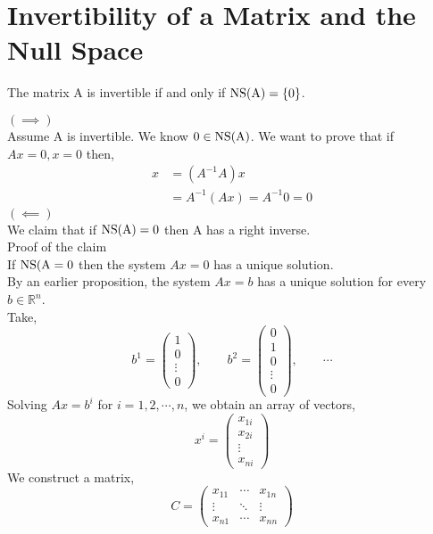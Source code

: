 \documentclass[12pt]{article}
\begin{document}
\section{Invertibility of a Matrix and the Null Space}
\begin{theo}{}
The matrix A is invertible if and only if \(\rm{NS}(A) = \{0\}\).
\end{theo}
\begin{prf}{}
\(\left(\implies\right)\)\\
Assume A is invertible. We know \(0 \in \rm{NS}(A)\). We want to prove that if \(Ax = 0, x = 0\) then,
\begin{align*}
x &= (A^{-1}A)x\\
&= A^{-1}(Ax) = A^{-1}0 = 0
\end{align*}
\(\left(\impliedby\right)\)\\
We claim that if \(\rm{NS}(A) = 0\) then A has a right inverse.\\
Proof of the claim\\
If \(\rm{NS}(A = 0\) then the system \(Ax = 0\) has a unique solution.\\
By an earlier proposition, the system \(Ax = b\) has a unique solution for every \(b \in \mathbb R^n\).\\
Take,
\[
b^1 = \begin{pmatrix}
    1 \\ 0 \\ \vdots\\ 0
\end{pmatrix},
\qquad b^2 = \begin{pmatrix}
    0 \\ 1 \\0\\ \vdots\\ 0
\end{pmatrix},
\qquad \cdots 
\]
Solving \(Ax = b^i\) for \(i = 1, 2, \cdots, n\), we obtain an array of vectors,
\[x^i = 
\begin{pmatrix}
    x_{1i} \\ x_{2i}\\ \vdots\\ x_{ni}
\end{pmatrix}
\]
We construct a matrix, 
\[C = \begin{pmatrix}
    x_{11} & \cdots &x_{1n}\\
    \vdots & \ddots & \vdots\\
    x_{n1} & \cdots & x_{nn}
\end{pmatrix}\]

\end{prf}
\end{document}
